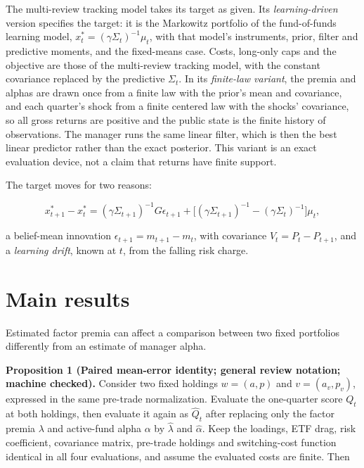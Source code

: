 \documentclass[11pt]{article}
\begin{document}
The multi-review tracking model takes its target as given. Its
\emph{learning-driven} version specifies the target: it is the Markowitz
portfolio of the fund-of-funds learning model,
\(x^*_t=(\gamma\Sigma_t)^{-1}\mu_t\), with that model's instruments, prior,
filter and predictive moments, and the fixed-means case. Costs,
long-only caps and the objective are those of the multi-review
tracking model, with the constant covariance replaced by the
predictive \(\Sigma_t\). In its \emph{finite-law variant}, the premia and alphas
are drawn once from a finite law with the prior's mean and covariance,
and each quarter's shock from a finite centered law with the shocks'
covariance, so all gross returns are positive and the public state is
the finite history of observations. The manager runs the same linear
filter, which is then the best linear predictor rather than the exact
posterior. This variant is an exact evaluation device, not a claim
that returns have finite support.

The target moves for two reasons:

\begin{equation*}
x^*_{t+1}-x^*_t=(\gamma\Sigma_{t+1})^{-1}G\epsilon_{t+1}
 +\bigl[(\gamma\Sigma_{t+1})^{-1}-(\gamma\Sigma_t)^{-1}\bigr]\mu_t,
\end{equation*}

a belief-mean innovation \(\epsilon_{t+1}=m_{t+1}-m_t\), with covariance
\(V_t=P_t-P_{t+1}\), and a \emph{learning drift}, known at \(t\), from the falling
risk charge.

\section{Main results}\label{sec:3}

Estimated factor premia can affect a comparison between two fixed
portfolios differently from an estimate of manager alpha.

\label{res:Proposition-1}
\textbf{Proposition 1 (Paired mean-error identity; general review notation; machine checked).} Consider two fixed
holdings \(w=(a,p)\) and \(v=(a_v,p_v)\), expressed in the same pre-trade normalization.
Evaluate the one-quarter score \(Q_t\) at both holdings, then evaluate it again as
\(\widehat Q_t\) after replacing only the factor premia \(\lambda\) and active-fund
alpha \(\alpha\) by \(\widehat\lambda\) and \(\widehat\alpha\). Keep the loadings,
ETF drag, risk coefficient, covariance matrix, pre-trade holdings and switching-cost
function identical in all four evaluations, and assume the evaluated costs are finite.
Then
\end{document}
